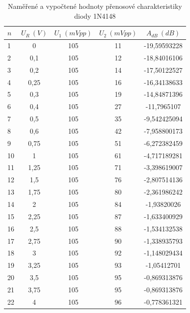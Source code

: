 \documentclass[a4paper, czech]{article}
\begin{document}
\begin{table}[H]
\centering
\begin{tabular}{lS[table-format=1.2, locale = DE]ccS[table-format=3.3, round-mode = places, round-precision = 3, locale = DE]}
\toprule
$n$ & {$U_R\ (V)$} & $U_1\ (mVpp)$ & $U_2\ (mVpp)$ & {$A_{dB}\ (dB)$}      \\
                     & 0      & 105     & 11      & -19,59593228  \\
2                     & 0,1    & 105     & 12      & -18,84016106  \\
3                     & 0,2    & 105     & 14      & -17,50122527  \\
4                     & 0,25   & 105     & 16      & -16,34138633  \\
5                     & 0,3    & 105     & 19      & -14,84871396  \\
6                     & 0,4    & 105     & 27      & -11,7965107   \\
7                     & 0,5    & 105     & 35      & -9,542425094  \\
8                     & 0,6    & 105     & 42      & -7,958800173  \\
9                     & 0,75   & 105     & 51      & -6,272382459  \\
10                    & 1      & 105     & 61      & -4,717189281  \\
11                    & 1,25   & 105     & 71      & -3,398619007  \\
12                    & 1,5    & 105     & 76      & -2,807514136  \\
13                    & 1,75   & 105     & 80      & -2,361986242  \\
14                    & 2      & 105     & 84      & -1,93820026   \\
15                    & 2,25   & 105     & 87      & -1,633400929  \\
16                    & 2,5    & 105     & 88      & -1,534132538  \\
17                    & 2,75   & 105     & 90      & -1,338935793  \\
18                    & 3      & 105     & 92      & -1,148029434  \\
19                    & 3,25   & 105     & 93      & -1,05412701   \\
20                    & 3,5    & 105     & 95      & -0,869313876  \\
21                    & 3,75   & 105     & 95      & -0,869313876  \\
22                    & 4      & 105     & 96      & -0,778361321  \\
\bottomrule
\end{tabular}
\caption{Naměřené a vypočtené hodnoty přenosové charakteristiky diody 1N4148}
\end{table}
\end{document}
